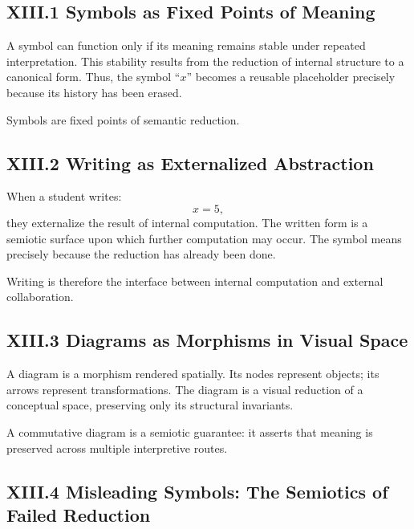 \documentclass[12pt,letterpaper]{article}
\begin{document}
\subsection{XIII.1 Symbols as Fixed Points of Meaning}

A symbol can function only if its meaning remains stable under repeated interpretation. This stability results from the reduction of internal structure to a canonical form. Thus, the symbol ``\(x\)'' becomes a reusable placeholder precisely because its history has been erased.

Symbols are fixed points of semantic reduction.

\subsection{XIII.2 Writing as Externalized Abstraction}

When a student writes:
\[
x = 5,
\]
they externalize the result of internal computation. The written form is a semiotic surface upon which further computation may occur. The symbol means precisely because the reduction has already been done.

Writing is therefore the interface between internal computation and external collaboration.

\subsection{XIII.3 Diagrams as Morphisms in Visual Space}

A diagram is a morphism rendered spatially. Its nodes represent objects; its arrows represent transformations. The diagram is a visual reduction of a conceptual space, preserving only its structural invariants.

A commutative diagram is a semiotic guarantee: it asserts that meaning is preserved across multiple interpretive routes.

\subsection{XIII.4 Misleading Symbols: The Semiotics of Failed Reduction}
\end{document}
